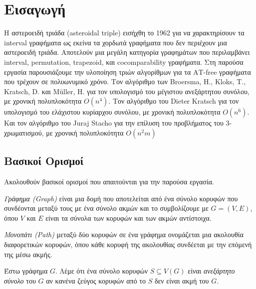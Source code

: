 \chapter{Εισαγωγή}
\label{ch:Introduction}

Η αστεροειδή τριάδα (asteroidal triple) εισήχθη το 1962 για να χαρακτηρίσουν τα interval γραφήματα ως εκείνα τα χορδωτά γραφήματα που δεν περιέχουν μια αστεροειδή τριάδα\cite{ref-20-independent-sets}. Αποτελούν μια μεγάλη κατηγορία γραφημάτων που περιλαμβάνει interval, permutation, trapezoid, και cocomparability γραφήματα.
Στη παρούσα εργασία παρουσιάζουμε την υλοποίηση τριών αλγορίθμων για τα ΑΤ-free γραφήματα που τρέχουν σε πολυωνυμικό χρόνο. Τον αλγόριθμο των Broersma, H., Kloks, T., Kratsch, D. και Müller, H.\cite{at-free-independent-sets} για τον υπολογισμό του μέγιστου ανεξάρτητου συνόλου, με χρονική πολυπλοκότητα $O(n^4)$. Τον αλγόριθμο του Dieter Kratsch\cite{at-free-domination} για τον υπολογισμό του ελάχιστου κυρίαρχου συνόλου, με χρονική πολυπλοκότητα $O(n^6)$. Και τον αλγόριθμο του Juraj Stacho\cite{at-free-3-colouring} για την επίλυση του προβλήματος του 3-χρωματισμού, με χρονική πολυπλοκότητα $O(n^2m)$

\section{Βασικοί Ορισμοί}
\label{sec:Definitions}

Ακολουθούν βασικοί ορισμοί που απαιτούνται για την παρούσα εργασία.

\begin{definition}
	\textit{Γράφημα (Graph)} είναι μια δομή που αποτελείται από ένα σύνολο κορυφών που συνδέονται μεταξύ τους με ένα σύνολο ακμών και το συμβολίζουμε με $G =(V,E)$, όπου $V$ και $E$ είναι τα σύνολα των κορυφών και των ακμών αντίστοιχα. 
\end{definition}


\begin{definition}
	\textit{Μονοπάτι (Path)} μεταξύ δύο κορυφών σε ένα γράφημα ονομάζεται μια ακολουθία διαφορετικών κορυφών, όπου κάθε κορυφή της ακολουθίας συνδέεται με την επόμενή της μέσω ακμής.
\end{definition}

\begin{definition}
	Έστω γράφημα $G$. Λέμε ότι ένα σύνολο κορυφών $S \subseteq V(G)$ είναι \textit{ανεξάρτητο σύνολο} του $G$ αν κανένα ζεύγος κορυφών από το $S$ δεν είναι ακμή του $G$. 
\end{definition}

